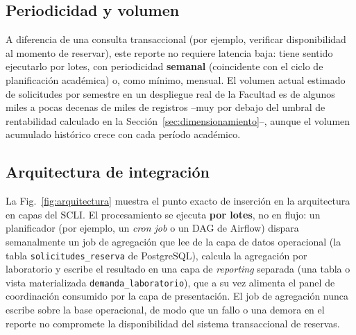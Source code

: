 \documentclass[10pt,journal]{IEEEtran}
\begin{document}
\subsection{Periodicidad y volumen}
A diferencia de una consulta transaccional (por ejemplo, verificar
disponibilidad al momento de reservar), este reporte no requiere latencia baja:
tiene sentido ejecutarlo por lotes, con periodicidad \textbf{semanal}
(coincidente con el ciclo de planificaci\'on acad\'emica) o, como m\'inimo,
mensual. El volumen actual estimado de solicitudes por semestre en un
despliegue real de la Facultad es de algunos miles a pocas decenas de miles de
registros --muy por debajo del umbral de rentabilidad calculado en la
Secci\'on~\ref{sec:dimensionamiento}--, aunque el volumen acumulado
hist\'orico crece con cada per\'iodo acad\'emico.

\subsection{Arquitectura de integraci\'on}
La Fig.~\ref{fig:arquitectura} muestra el punto exacto de inserci\'on en la
arquitectura en capas del SCLI. El procesamiento se ejecuta \textbf{por
lotes}, no en flujo: un planificador (por ejemplo, un \textit{cron job} o un
DAG de Airflow) dispara semanalmente un job de agregaci\'on que lee de la capa
de datos operacional (la tabla \texttt{solicitudes\_reserva} de PostgreSQL),
calcula la agregaci\'on por laboratorio y escribe el resultado en una capa de
\emph{reporting} separada (una tabla o vista materializada
\texttt{demanda\_laboratorio}), que a su vez alimenta el panel de
coordinaci\'on consumido por la capa de presentaci\'on. El job de agregaci\'on
nunca escribe sobre la base operacional, de modo que un fallo o una demora en
el reporte no compromete la disponibilidad del sistema transaccional de
reservas.
\end{document}
